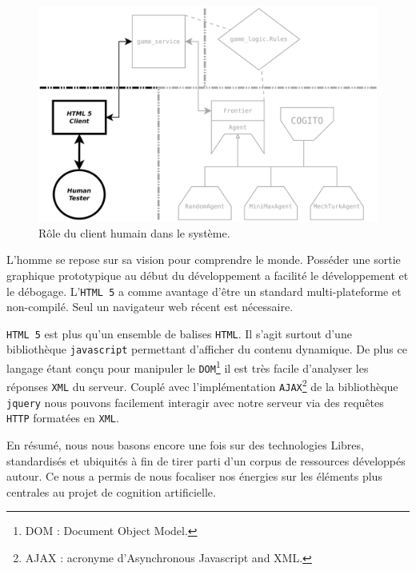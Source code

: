 \begin{figure}[H] 
\centering
\includegraphics[width=\textwidth]{files/william/archi_client_humain} 
\caption{Rôle du client humain dans le système.} 
\end{figure} 

L'homme se repose sur sa vision pour comprendre le monde. Posséder une sortie graphique prototypique au début du développement a facilité le développement et le débogage. L'\texttt{HTML 5} a comme avantage d'être un standard multi-plateforme et non-compilé. Seul un navigateur web récent est nécessaire.

\og \texttt{HTML 5} \fg{} est plus qu'un ensemble de balises \texttt{HTML}. Il s'agit surtout d'une bibliothèque \texttt{javascript} permettant d'afficher du contenu dynamique. De plus ce langage étant conçu pour manipuler le \texttt{DOM}\footnote{DOM : Document Object Model.} il est très facile d'analyser les réponses \texttt{XML} du serveur. Couplé avec l'implémentation \texttt{AJAX}\footnote{AJAX : acronyme d'Asynchronous Javascript and XML.} de la bibliothèque \texttt{jquery} nous pouvons facilement interagir avec notre serveur via des requêtes \texttt{HTTP} formatées en \texttt{XML}.

En résumé, nous nous basons encore une fois sur des technologies Libres, standardisés et ubiquités à fin de tirer parti d'un corpus de ressources développés autour. Ce nous a permis de nous focaliser nos énergies sur les éléments plus centrales au projet de cognition artificielle.  

